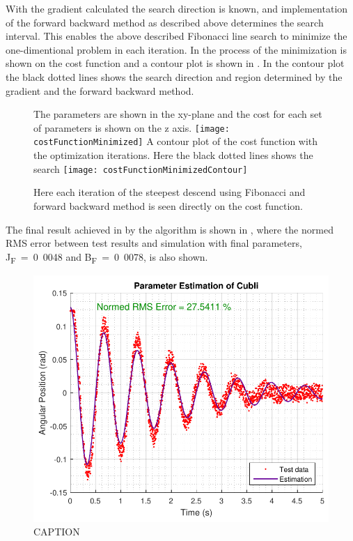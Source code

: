 With the gradient calculated the search direction is known, and implementation of the forward backward method as described above determines the search interval. This enables the above described Fibonacci line search to minimize the one-dimentional problem in each iteration. In  the process of the minimization is shown on the cost function and a contour plot is shown in . In the contour plot the black dotted lines shows the search direction and region determined by the gradient and the forward backward method.

\begin{figure}[H]
  \begin{minipage}{\linewidth}
    \captionsetup[subfigure]{font = footnotesize}
    \centering
    \subcaptionbox
    {
      The parameters are shown in the xy-plane and the cost for each set of parameters is shown on the z axis.
      \label{CostFunctionMinimized3D}
    }
    {
      \texttt{[image: costFunctionMinimized]}
    }\quad
    \subcaptionbox
    {
      A contour plot of the cost function with the optimization iterations. Here the black dotted lines shows the search 
      \label{CostFunctionMinimizedContour}
    }
    {
      \texttt{[image: costFunctionMinimizedContour]}
    }
    \caption{Here each iteration of the steepest descend using Fibonacci and forward backward method is seen directly on the cost function.}
    \label{CostFunctionMinimized}
  \end{minipage}
\end{figure}

The final result achieved in by the algorithm is shown in , where the normed RMS error between test results and simulation with final parameters, \si{J_F = 0.0048} and \si{B_F = 0.0078}, is also shown.

\begin{figure}[H] 
	\centering
	\includegraphics[width=.6\textwidth]{figures/resultOfGradientWithFibonacciAndForwardBackward}
	\caption{CAPTION}
	\label{resultOfGradientWithFibonacciAndForwardBackward}
\end{figure}
